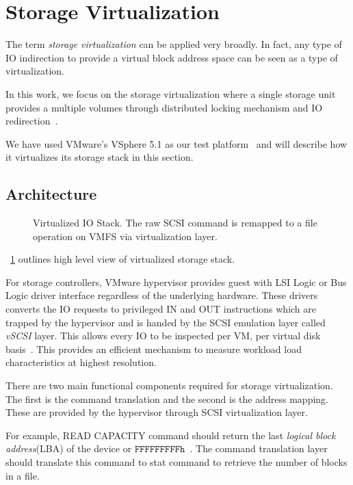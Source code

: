 \section{Storage Virtualization}
\label{VIRT}

The term \emph{storage virtualization} can be applied very broadly. 
In fact, any type of IO indirection to provide a virtual block address space can be seen as a type of virtualization.

In this work, we focus on the storage virtualization where a single storage unit provides a multiple volumes through distributed locking mechanism and IO redirection~\cite{vaghani:2010, gupta:2011, soltis:1996}.

We have used VMware's VSphere 5.1 as our test platform~\cite{vmware:2013} and will describe how it virtualizes its storage stack in this section.

\subsection{Architecture}

\begin{figure}[!t]
\centering

\label{fig:vio}
\caption{Virtualized IO Stack. The raw SCSI command is remapped to a file operation on VMFS via virtualization layer.}
\end{figure}

\figurename~\ref{fig:vio} outlines high level view of virtualized storage stack.

For storage controllers, VMware hypervisor provides guest with LSI Logic or Bus Logic driver interface regardless of the underlying hardware. 
These drivers converts the IO requests to privileged IN and OUT instructions which are trapped by the hypervisor and is handed by the SCSI emulation layer called \emph{vSCSI} layer. 
This allows every IO to be inspected per VM, per virtual disk basis~\cite{ahmad:2007}. 
This provides an efficient mechanism to measure workload load characteristics at highest resolution.  

There are two main functional components required for storage virtualization.
The first is the command translation and the second is the address mapping. 
These are provided by the hypervisor through SCSI virtualization layer.

For example, READ CAPACITY command should return the last \emph{logical block address}(LBA) of the device or $\mathtt{FFFFFFFFFh}$~\cite{seagate:2006}. 
The command translation layer should translate this command to stat command to retrieve the number of blocks in a file. 

